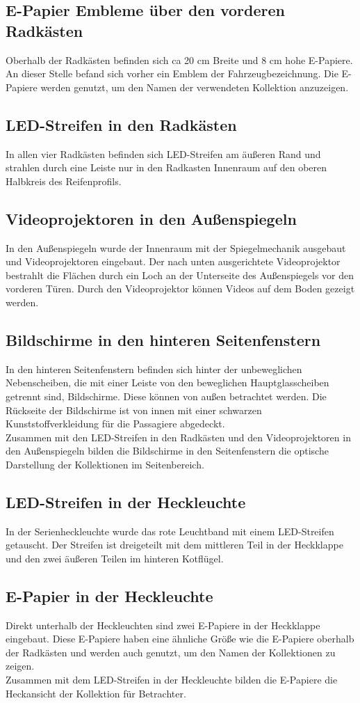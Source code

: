 \subsection{E-Papier Embleme über den vorderen Radkästen}
Oberhalb der Radkästen befinden sich ca 20 cm Breite und 8 cm hohe E-Papiere. An dieser Stelle befand sich vorher ein Emblem der Fahrzeugbezeichnung.
Die E-Papiere werden genutzt, um den Namen der verwendeten Kollektion anzuzeigen.
\subsection{LED-Streifen in den Radkästen}
In allen vier Radkästen befinden sich LED-Streifen am äußeren Rand und strahlen durch eine Leiste nur in den Radkasten Innenraum auf den oberen Halbkreis des Reifenprofils. 
\subsection{Videoprojektoren in den Außenspiegeln}
In den Außenspiegeln wurde der Innenraum mit der Spiegelmechanik ausgebaut und Videoprojektoren eingebaut. Der nach unten ausgerichtete Videoprojektor bestrahlt die Flächen durch ein Loch an der Unterseite des Außenspiegels vor den vorderen Türen.
Durch den Videoprojektor können Videos auf dem Boden gezeigt werden.
\subsection{Bildschirme in den hinteren Seitenfenstern}
In den hinteren Seitenfenstern befinden sich hinter der unbeweglichen Nebenscheiben, die mit einer Leiste von den beweglichen Hauptglasscheiben getrennt sind, Bildschirme. Diese können von außen betrachtet werden. Die Rückseite der Bildschirme ist von innen mit einer schwarzen Kunststoffverkleidung für die Passagiere abgedeckt.\\
Zusammen mit den LED-Streifen in den Radkästen und den Videoprojektoren in den Außenspiegeln bilden die Bildschirme in den Seitenfenstern die optische Darstellung der Kollektionen im Seitenbereich.
\subsection{LED-Streifen in der Heckleuchte}
In der Serienheckleuchte wurde das rote Leuchtband mit einem LED-Streifen getauscht. Der Streifen ist dreigeteilt mit dem mittleren Teil in der Heckklappe und den zwei äußeren Teilen im hinteren Kotflügel.
\subsection{E-Papier in der Heckleuchte}
Direkt unterhalb der Heckleuchten sind zwei E-Papiere in der Heckklappe eingebaut.
Diese E-Papiere haben eine ähnliche Größe wie die E-Papiere oberhalb der Radkästen und werden auch genutzt, um den Namen der Kollektionen zu zeigen.\\
Zusammen mit dem LED-Streifen in der Heckleuchte bilden die E-Papiere die Heckansicht der Kollektion für Betrachter.
